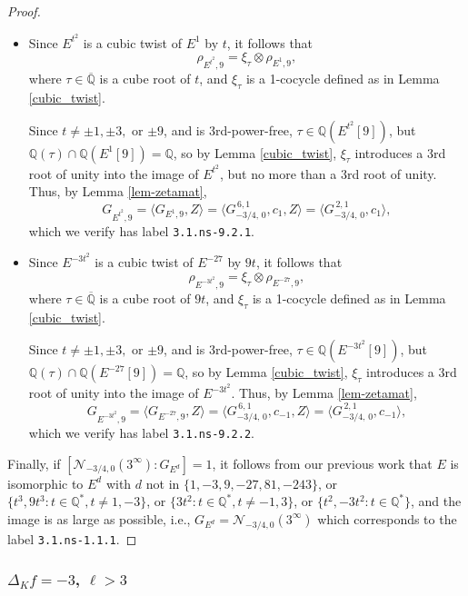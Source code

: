 \documentclass[11pt]{amsart}
\theoremstyle{definition}
\newcommand{\Q}{\mathbb Q}
\begin{document}
\begin{proof}
 \begin{itemize}
     \item Since $E^{t^2}$ is a cubic twist of $E^1$ by $t$, it follows that 
     \[ \rho_{E^{t^2}, 9} = \xi_{\tau} \otimes \rho_{E^1, 9},\] 
     where $\tau \in \overline{\Q}$ is a cube root of $t$, and $\xi_\tau$ is a 1-cocycle defined as in Lemma \ref{cubic_twist}.
     
     Since $t \neq \pm 1, \pm 3,$ or $\pm 9$, and is 3rd-power-free, $\tau \in \Q(E^{t^2}[9])$, but $\Q(\tau) \cap \Q(E^1[9]) = \Q$, so by Lemma \ref{cubic_twist}, $\xi_\tau$ introduces a 3rd root of unity into the image of $E^{t^2}$, but no more than a 3rd root of unity. Thus, by Lemma \ref{lem-zetamat}, \[ G_{E^{t^2}, 9} = \langle G_{E^1, 9}, Z \rangle = \langle G^{\, 6,1}_{-3/4, \, 0}, c_1, Z \rangle = \langle G^{\, 2,1}_{-3/4, \, 0}, c_1 \rangle,\]
     which we verify has label \texttt{3.1.ns-9.2.1}.
     
     \item Since $E^{-3t^2}$ is a cubic twist of $E^{-27}$ by $9t$, it follows that 
     \[ \rho_{E^{-3t^2}, 9} = \xi_{\tau} \otimes \rho_{E^{-27}, 9},\] 
     where $\tau \in \overline{\Q}$ is a cube root of $9t$, and $\xi_\tau$ is a 1-cocycle defined as in Lemma \ref{cubic_twist}.
     
     Since $t \neq \pm 1, \pm 3,$ or $\pm 9$, and is 3rd-power-free, $\tau \in \Q(E^{-3t^2}[9])$, but $\Q(\tau) \cap \Q(E^{-27}[9]) = \Q$, so by Lemma \ref{cubic_twist}, $\xi_\tau$ introduces a 3rd root of unity into the image of $E^{-3t^2}$. Thus, by Lemma \ref{lem-zetamat}, \[ G_{E^{-3t^2}, 9} = \langle G_{E^{-27}, 9}, Z \rangle = \langle G^{\, 6,1}_{-3/4, \, 0}, c_{-1}, Z \rangle = \langle G^{\, 2,1}_{-3/4, \, 0}, c_{-1} \rangle,\]
     which we verify has label \texttt{3.1.ns-9.2.2}.
 \end{itemize}

 Finally, if $[\mathcal{N}_{-3/4,0}(3^{\infty}): G_{E^d}]=1$, it follows from our previous work that $E$ is isomorphic to $E^d$ with $d$ not in $\{1, -3, 9, -27, 81, -243 \}$, or $\{ t^3, 9t^3 : t \in \Q^{\ast}, t \neq 1, -3 \}$, or $\{ 3t^2 : t \in \Q^{\ast}, t \neq -1, 3\}$, or $\{t^2, -3t^2 : t \in \Q^{\ast}\}$, and the image is as large as possible, i.e., $G_{E^d}=\mathcal{N}_{-3/4,0}(3^{\infty})$ which corresponds to the label \texttt{3.1.ns-1.1.1}.
    \end{proof}


\subsubsection{$\Delta_Kf=-3$, $\ell > 3$}\label{sec-delta3ellmorethan3}
\end{document}

